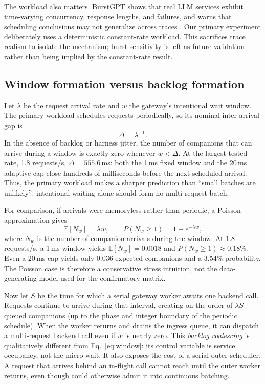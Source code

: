 The workload also matters. BurstGPT shows that real LLM services exhibit
time-varying concurrency, response lengths, and failures, and warns that
scheduling conclusions may not generalize across traces
\citep{wang2024burstgpt}. Our primary experiment deliberately uses a
deterministic constant-rate workload. This sacrifices trace realism to isolate
the mechanism; burst sensitivity is left as future validation rather than
being implied by the constant-rate result.

\subsection{Window formation versus backlog formation}
\label{sec:mechanism-model}

Let $\lambda$ be the request arrival rate and $w$ the gateway's intentional
wait window. The primary workload schedules requests periodically, so its
nominal inter-arrival gap is
\begin{equation}
  \Delta = \lambda^{-1}.
  \label{eq:periodic-gap}
\end{equation}
In the absence of backlog or harness jitter, the number of companions that can
arrive during a window is exactly zero whenever $w<\Delta$. At the largest
tested rate, 1.8 requests/s, $\Delta=555.6$\,ms: both the 1\,ms fixed window
and the 20\,ms adaptive cap close hundreds of milliseconds before the next
scheduled arrival. Thus, the primary workload makes a sharper prediction than
``small batches are unlikely'': intentional waiting alone should form no
multi-request batch.

For comparison, if arrivals were memoryless rather than periodic, a Poisson
approximation gives
\begin{equation}
  \mathbb{E}[N_w] = \lambda w, \qquad
  P(N_w \ge 1) = 1-e^{-\lambda w},
  \label{eq:window}
\end{equation}
where $N_w$ is the number of companion arrivals during the window. At
1.8 requests/s, a 1\,ms window yields
$\mathbb{E}[N_w]=0.0018$ and $P(N_w\ge1)\approx0.18\%$. Even a 20\,ms cap
yields only 0.036 expected companions and a 3.54\% probability. The Poisson
case is therefore a conservative stress intuition, not the data-generating
model used for the confirmatory matrix.

Now let $S$ be the time for which a serial gateway worker awaits one backend
call. Requests continue to arrive during that interval, creating on the order
of $\lambda S$ queued companions (up to the phase and integer boundary of the
periodic schedule). When the worker returns and drains the ingress queue, it
can dispatch a multi-request backend call even if $w$ is nearly zero.
This \emph{backlog coalescing} is qualitatively different from
Eq.~\ref{eq:window}: its control variable is service occupancy, not the
micro-wait. It also exposes the cost of a serial outer scheduler. A request
that arrives behind an in-flight call cannot reach \vllm{} until the outer
worker returns, even though \vllm{} could otherwise admit it into continuous
batching.

